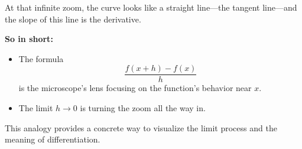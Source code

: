\documentclass[10pt,twocolumn]{article}
\begin{document}
At that infinite zoom, the curve looks like a straight line—the tangent line—and the slope of this line is the derivative.

\medskip

\textbf{So in short:}

\begin{itemize}
  \item The formula
  \[
  \frac{f(x+h) - f(x)}{h}
  \]
  is the microscope’s lens focusing on the function's behavior near \(x\).
  
  \item The limit \(h \to 0\) is turning the zoom all the way in.
\end{itemize}

This analogy provides a concrete way to visualize the limit process and the meaning of differentiation.
\end{document}
